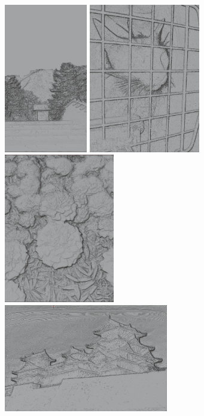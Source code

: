 \documentclass[12pt, letterpaper]{article}
\begin{document}
\begin{figure}[!ht]
    \begin{center}
        \includegraphics[height = 6.5cm]{20240630_143910_3dsky}
        \includegraphics[height = 6.5cm]{example_6.png}
        \includegraphics[height = 6.5cm]{example_0_pred_colored_3d}
        \includegraphics[height = 4.7cm]{himejicastle_event_2_3d}

\end{center}
\end{figure}
\end{document}
